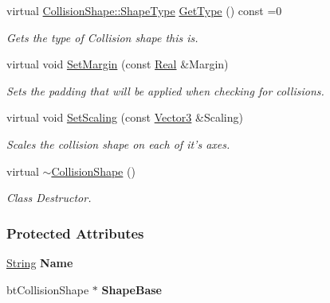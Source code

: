 \begin{DoxyCompactItemize}
virtual \hyperlink{classphys_1_1CollisionShape_af3ba4fd8af5b9557f912d2f5ff35a588}{CollisionShape::ShapeType} \hyperlink{classphys_1_1CollisionShape_aa4911840c6e877cfecf201b7f43a57e3}{GetType} () const =0
\begin{DoxyCompactList}\small\item\em Gets the type of Collision shape this is. \item\end{DoxyCompactList}\item 
virtual void \hyperlink{classphys_1_1CollisionShape_a2dd61bbdddf1316672e8bf22dd734769}{SetMargin} (const \hyperlink{namespacephys_af7eb897198d265b8e868f45240230d5f}{Real} \&Margin)
\begin{DoxyCompactList}\small\item\em Sets the padding that will be applied when checking for collisions. \item\end{DoxyCompactList}\item 
virtual void \hyperlink{classphys_1_1CollisionShape_ac3bddfecd0f4bc4ff449f625b05f0722}{SetScaling} (const \hyperlink{classphys_1_1Vector3}{Vector3} \&Scaling)
\begin{DoxyCompactList}\small\item\em Scales the collision shape on each of it's axes. \item\end{DoxyCompactList}\item 
\hypertarget{classphys_1_1CollisionShape_ad65aeefdc75c39afaa0399493fcc6555}{
virtual \hyperlink{classphys_1_1CollisionShape_ad65aeefdc75c39afaa0399493fcc6555}{$\sim$CollisionShape} ()}
\label{classphys_1_1CollisionShape_ad65aeefdc75c39afaa0399493fcc6555}

\begin{DoxyCompactList}\small\item\em Class Destructor. \item\end{DoxyCompactList}\end{DoxyCompactItemize}
\subsubsection*{Protected Attributes}
\begin{DoxyCompactItemize}
\item 
\hypertarget{classphys_1_1CollisionShape_a7ca222eb9f3a6589a177f1344aa3b7d8}{
\hyperlink{namespacephys_aa03900411993de7fbfec4789bc1d392e}{String} {\bfseries Name}}
\label{classphys_1_1CollisionShape_a7ca222eb9f3a6589a177f1344aa3b7d8}

\item 
\hypertarget{classphys_1_1CollisionShape_ad1dd37293680c8379381148deda07dc4}{
btCollisionShape $\ast$ {\bfseries ShapeBase}}
\label{classphys_1_1CollisionShape_ad1dd37293680c8379381148deda07dc4}

\end{DoxyCompactItemize}
